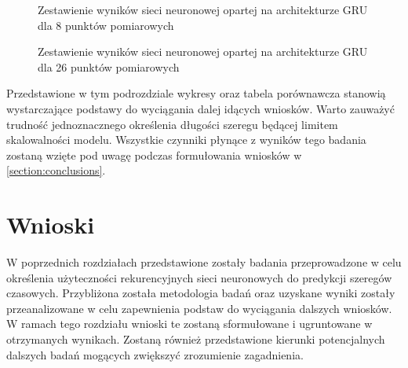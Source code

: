 \documentclass[10pt,a4paper]{article}
\begin{document}
\begin{figure}[!ht]
	\centering
	\caption{Zestawienie wyników sieci neuronowej opartej na architekturze GRU dla 8 punktów pomiarowych}
	\label{figure:scale_8}
\end{figure}
\FloatBarrier

\begin{figure}[!ht]
	\centering
	\caption{Zestawienie wyników sieci neuronowej opartej na architekturze GRU dla 26 punktów pomiarowych}
	\label{figure:scale_26}
\end{figure}
\FloatBarrier

Przedstawione w tym podrozdziale wykresy oraz tabela porównawcza stanowią wystarczające podstawy do wyciągania dalej idących wniosków. Warto zauważyć trudność jednoznacznego określenia długości szeregu będącej limitem skalowalności modelu. Wszystkie czynniki płynące z wyników tego badania zostaną wzięte pod uwagę podczas formułowania wniosków w \autoref{section:conclusions}.

\newpage
\section{Wnioski}
\label{section:conclusions}
W poprzednich rozdziałach przedstawione zostały badania przeprowadzone w celu określenia użyteczności rekurencyjnych sieci neuronowych do predykcji szeregów czasowych. Przybliżona została metodologia badań oraz uzyskane wyniki zostały przeanalizowane w celu zapewnienia podstaw do wyciągania dalszych wniosków. W ramach tego rozdziału wnioski te zostaną sformułowane i ugruntowane w otrzymanych wynikach. Zostaną również przedstawione kierunki potencjalnych dalszych badań mogących zwiększyć zrozumienie zagadnienia.
\end{document}
